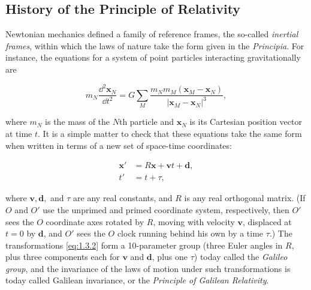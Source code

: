 
\subsection{History of the Principle of Relativity}\label{sec:1.3}

Newtonian mechanics defined a family of reference frames, the so-called
\emph{inertial frames}, within which the laws of nature take the form given in
the \emph{Principia}. For instance, the equations for a system of point
particles interacting gravitationally are

\begin{equation}
  m_N\frac{\dd^2\mathbf x_N}{\dd t^2}
  =
  G\sum_M
  \frac{m_Nm_M(\mathbf x_M-\mathbf x_N)}
       {\lvert\mathbf x_M-\mathbf x_N\rvert^3},
  \tag{1.3.1}\label{eq:1.3.1}
\end{equation}

where \(m_N\) is the mass of the \(N\)th particle and \(\mathbf x_N\) is its
Cartesian position vector at time \(t\). It is a simple matter to check that
these equations take the same form when written in terms of a new set of
space-time coordinates:

\begin{equation}
  \begin{aligned}
    \mathbf x'&=R\mathbf x+\mathbf v t+\mathbf d,\\
    t'&=t+\tau,
  \end{aligned}
  \tag{1.3.2}\label{eq:1.3.2}
\end{equation}

where \(\mathbf v,\mathbf d,\) and \(\tau\) are any real constants, and \(R\)
is any real orthogonal matrix. (If \(O\) and \(O'\) use the unprimed and
primed coordinate system, respectively, then \(O'\) sees the \(O\) coordinate
axes rotated by \(R\), moving with velocity \(\mathbf v\), displaced at
\(t=0\) by \(\mathbf d\), and \(O'\) sees the \(O\) clock running behind his
own by a time \(\tau\).) The transformations \eqref{eq:1.3.2} form a
10-parameter group (three Euler angles in \(R\), plus three components each
for \(\mathbf v\) and \(\mathbf d\), plus one \(\tau\)) today called the
\emph{Galileo group}, and the invariance of the laws of motion under such
transformations is today called Galilean invariance, or the \emph{Principle of
Galilean Relativity}.

